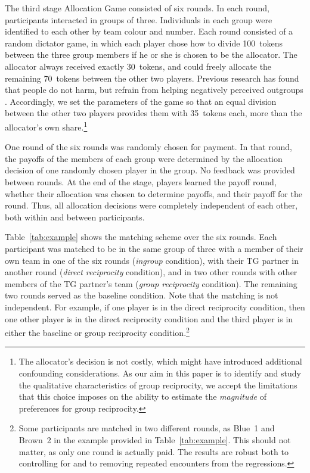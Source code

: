 \documentclass[12pt,a4paper]{article}\usepackage[]{graphicx}\usepackage[]{color}
\begin{document}
The third stage Allocation Game consisted of six rounds. In each round, participants interacted in groups of three. Individuals in each group were identified to each other by
team colour and number. Each round consisted of a random dictator game, in which each player chose how to divide 100~tokens between the three group members if he or she is chosen to be the allocator. The allocator always received exactly 30~tokens, and could freely allocate the remaining 70~tokens between the other two players. Previous research has found that
people do not harm, but refrain from helping negatively perceived outgroups
\citep{weisel2015ingroup}. Accordingly, we set the parameters of the game so
that an equal division between the other two players provides them with 35~tokens each, more than the allocator's own share.\footnote{
  The allocator's decision is not costly, which might have introduced additional confounding considerations. As our aim in this paper is to identify and study the qualitative characteristics of group reciprocity, we accept the limitations that this choice imposes on the ability to estimate the \emph{magnitude} of preferences for group reciprocity. 
}

One round of the six rounds was randomly chosen for payment. In that round, the payoffs of the members of each group were determined by the allocation decision of one randomly chosen player in the group. No feedback was provided between rounds. At the end of the stage, players learned the payoff round, whether their allocation was chosen to determine payoffs, and their payoff for the round. Thus, all allocation decisions were completely independent of each other, both within and between participants.


Table~\ref{tab:example} shows the matching scheme over the six rounds. Each participant was matched to be in the same group of three with a member of their own team in one of the six rounds (\emph{ingroup} condition), with their TG partner in another round (\emph{direct reciprocity} condition), and in two other rounds with other members of the TG partner's team (\emph{group reciprocity} condition). The remaining two rounds served as the baseline condition. Note that the matching is not independent. For example, if one player is in the direct reciprocity condition, then one other player is in the direct reciprocity condition and the third player is in either the baseline or group reciprocity condition.\footnote{
Some participants are matched in two different rounds, as Blue~1 and Brown~2 in the example provided in Table~\ref{tab:example}. This should not matter, as only one round is actually paid. The results are robust both to controlling for and to removing repeated encounters from the regressions.
}
\end{document}
